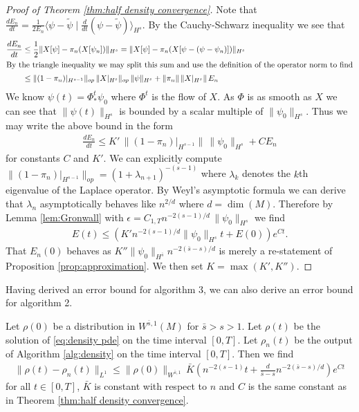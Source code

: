 \documentclass[final,leqno]{siamltex1213}
\begin{document}
\begin{proof}[Proof of Theorem \ref{thm:half density convergence}]
	Note that $\frac{dE_{n}}{dt} = \frac{1}{2E_{n}} \langle  \psi - \tilde{\psi} \mid \frac{d}{dt} ( \psi -\tilde{\psi} )\rangle_{H^{s}}$.
	By the Cauchy-Schwarz inequality we see that
	\begin{align}
		\frac{dE_{n}}{dt} &\leq  \frac{1}{2} \| X[\psi] - \pi_{n}(X[\psi_{n}]) \|_{H^{s}} = \| X[\psi] - \pi_{n}( X[\psi- (\psi-\psi_{n})]) \|_{H^{s}} \\
	\intertext{By the triangle inequality we may split this sum and use the definition of the operator norm to find}
		&\leq \| (1-\pi_{n})|_{H^{s-1}} \|_{op} \, \|X|_{H^{s}} \|_{op} \, \| \psi \|_{H^{s}} + \| \pi_{n} \| \, \|X|_{H^{s}} \| \, E_{n} \\
	\end{align}
	We know $\psi(t) = \Phi^{t}_{*}\psi_{0}$ where $\Phi^{t}$ is the flow of $X$.
	As $\Phi$ is as smooth as $X$ we can see that $\| \psi(t) \|_{H^{s}}$ is bounded by a scalar multiple of $\| \psi_{0} \|_{H^{s}}$.
	Thus we may write the above bound in the form
	\begin{align}
		\frac{dE_{n}}{dt} \leq K' \, \| (1- \pi_{n})|_{H^{s-1}} \| \, \| \psi_{0}\|_{H^{s}}+ C E_{n}
	\end{align}
	for constants $C$ and $K'$.
	We can explicitly compute $\| (1-\pi_{n})|_{H^{s-1}} \|_{op} = (1+\lambda_{n+1})^{-(s-1)}$ where $\lambda_{k}$ denotes the $k$th eigenvalue of the Laplace operator.
	By Weyl's asymptotic formula \cite[Theorem B.2]{Chavel1984} we
	can derive that $\lambda_{n}$ asymptotically behaves like $n^{2/d}$ where $d = \dim(M)$.
	Therefore by Lemma \ref{lem:Gronwall} with $\epsilon = C_{1,T} n^{-2(s-1) / d} \, \| \psi_{0}\|_{H^{s}}$
	we find
	\begin{align}
		E(t) \leq ( K' n^{-2(s-1) / d} \| \psi_{0} \|_{H^{s}} t+  E(0) ) e^{C t}.
	\end{align}
	That $E_{n}(0)$ behaves as $K'' \| \psi_{0} \|_{H^{\bar{s}}} n^{-2(\bar{s}-s)/d}$ is merely a re-statement of Proposition \ref{prop:approximation}.
	We then set $K = \max(K', K'')$.
\end{proof}

Having derived an error bound for algorithm 3, we can also derive an error bound for algorithm 2.

\begin{theorem} \label{thm:density convergence}
	Let $\rho(0)$ be a distribution in $W^{\bar{s},1}(M)$ for $\bar{s} > s >1$.
	Let $\rho(t)$ be the solution of \eqref{eq:density pde} on the time interval $[0,T]$.
	Let $\rho_{n}(t)$ be the output of Algorithm \ref{alg:density} on the time interval $[0,T]$.
	Then we find
	\begin{align}
		\| \rho(t) - \rho_{n}(t) \|_{L^{1}} \leq \| \rho(0) \|_{W^{\bar{s},1}} \, \bar{K} \left( n^{-2(s-1)} t+  \frac{d}{\bar{s}-s} n^{-2(\bar{s}-s)/d} \right) e^{C t}
	\end{align}
	for all $t \in [0,T]$, $\bar{K}$ is constant with respect to $n$ and $C$ is the same constant as in Theorem \ref{thm:half density convergence}.
\end{theorem}
\end{document}
